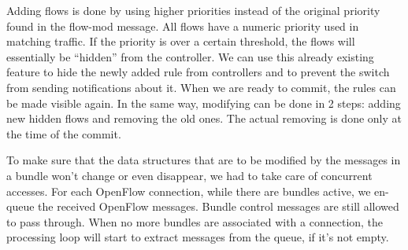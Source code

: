 Adding flows is done by using higher priorities instead of the original priority found in the flow-mod message. All flows
have a numeric priority used in matching traffic. If the priority is over a certain threshold, the flows will essentially
be ``hidden'' from the controller. We can use this already existing feature to hide the newly added rule from controllers
and to prevent the switch from sending notifications about it.
When we are ready to commit, the rules can be made visible again. In the same way, modifying can be done in 2 steps:
adding new hidden flows and removing the old ones. The actual removing is done only at the time of the commit.

To make sure that the data structures that are to be modified by the messages in a bundle won't change or even disappear,
we had to take care of concurrent accesses. For each OpenFlow connection, while there are bundles active, we en-queue the
received OpenFlow messages. Bundle control messages are still allowed to pass through. When no more bundles are associated
with a connection, the processing loop will start to extract messages from the queue, if it's not empty.